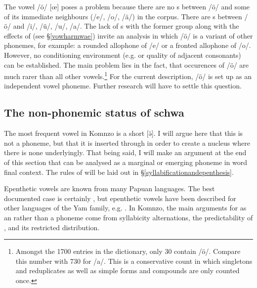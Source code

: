 The vowel /ö/ [œ] poses a problem because there are no s between /ö/ and some of its immediate neighbours (/e/, /o/, /ä/) in the corpus. There are s between /ö/ and /i/, /ü/, /u/, /a/. The lack of s with the former group along with the effects of  (see \S{}\ref{vowharmwae}) invite an analysis in which /ö/ is a variant of other phonemes, for example: a rounded allophone of /e/ or a fronted allophone of /o/. However, no conditioning environment (e.g.  or quality of adjacent consonants) can be established. The main problem lies in the fact, that occurences of /ö/ are much rarer than all other vowels.\footnote{Amongst the 1700 entries in the dictionary, only 30 contain /ö/. Compare this number with 730 for /a/. This is a conservative count in which singletons and reduplicates as well as simple forms and compounds are only counted once.} For the current description, /ö/ is set up as an independent vowel phoneme. Further research will have to settle this question.
\vspace{-.2cm}

\subsection{The non-phonemic status of schwa} \label{schwa-as-non-phoneme}

The most frequent vowel in Komnzo is a short  [ə̆]. I will argue here that this is not a phoneme, but that it is inserted through  in order to create a  nucleus where there is none underlyingly. That being said, I will make an argument at the end of this section that  can be analysed as a marginal or emerging phoneme in word final context. The rules of  will be laid out in \S{}\ref{syllabificationandepenthesis}.%

Epenthetic vowels are known from many Papuan languages. The best documented case is certainly  \citep{Biggs:1963wk, Pawley:1966wj, Blevins:2010ee}, but epenthetic vowels have been described for other languages of the Yam family, e.g.  \citep{Evans:ji}. In Komnzo, the main arguments for  as an  rather than a phoneme come from syllabicity alternations, the predictability of , and its restricted distribution.%

